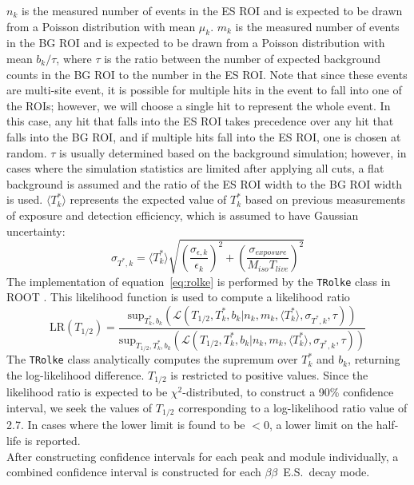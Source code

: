 \documentclass[notitlepage,rmp,aps,10pt]{revtex4-1}
\newcommand{\bb}{${\beta \beta}$}
\newcommand{\bbes}{\bb~E.S.}
\newcommand{\msmd}{multi-site event}
\begin{document}
$n_k$ is the measured number of events in the ES ROI and is expected to be drawn from a Poisson distribution with mean $\mu_k$.
$m_k$ is the measured number of events in the BG ROI and is expected to be drawn from a Poisson distribution with mean $b_k/\tau$, where $\tau$ is the ratio between the number of expected background counts in the BG ROI to the number in the ES ROI.
Note that since these events are \msmd, it is possible for multiple hits in the event to fall into one of the ROIs; however, we will choose a single hit to represent the whole event.
In this case, any hit that falls into the ES ROI takes precedence over any hit that falls into the BG ROI, and if multiple hits fall into the ES ROI, one is chosen at random.
$\tau$ is usually determined based on the background simulation; however, in cases where the simulation statistics are limited after applying all cuts, a flat background is assumed and the ratio of the ES ROI width to the BG ROI width is used.
$\langle T^*_k\rangle$ represents the expected value of $T^*_k$ based on previous measurements of exposure and detection efficiency, which is assumed to have Gaussian uncertainty:
\begin{equation}
  \sigma_{T^*,k} = \langle T^*_k\rangle\sqrt{(\frac{\sigma_{\epsilon,k}}{\epsilon_k })^2 + (\frac{\sigma_{exposure}}{M_{iso}T_{live} })^2}
\end{equation}
The implementation of equation~\ref{eq:rolke} is performed by the \texttt{TRolke} class in ROOT \cite{rolke2005}.
This likelihood function is used to compute a likelihood ratio
\begin{equation}
  \mathrm{LR}(T_{1/2}) = \frac{\mathrm{sup}_{T^*_k,b_k}(\mathcal{L}(T_{1/2},T^*_k,b_k|n_k,m_k,\langle T^*_k\rangle, \sigma_{T^*,k},\tau))}{\mathrm{sup}_{T_{1/2},T^*_k,b_k}(\mathcal{L}(T_{1/2},T^*_k,b_k|n_k,m_k,\langle T^*_k\rangle, \sigma_{T^*,k},\tau))}
\end{equation}
The \texttt{TRolke} class analytically computes the supremum over $T^*_k$ and $b_k$, returning the log-likelihood difference.
$T_{1/2}$ is restricted to positive values.
Since the likelihood ratio is expected to be $\chi^2$-distributed, to construct a 90\% confidence interval, we seek the values of $T_{1/2}$ corresponding to a log-likelihood ratio value of 2.7.
In cases where the lower limit is found to be $<0$, a lower limit on the half-life is reported.
\\
After constructing confidence intervals for each peak and module individually, a combined confidence interval is constructed for each \bbes\ decay mode.
\end{document}
